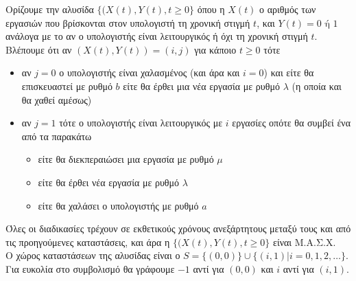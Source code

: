 \documentclass[a4paper,11pt]{article}
\newcommand{\mc}{Μ.Α.Σ.Χ. }
\begin{document}
Ορίζουμε την αλυσίδα $\{(X(t),Y(t),t\geq 0\}$ όπου η $X(t)$ ο αριθμός των εργασιών που βρίσκονται στον υπολογιστή τη χρονική στιγμή $t$, και $Y(t)=0 \text{ ή } 1$ ανάλογα με το αν ο υπολογιστής είναι λειτουργικός ή όχι τη χρονική στιγμή $t$.
\\[8pt]
Βλέπουμε ότι αν $(X(t),Y(t)) = (i,j)$ για κάποιο $t \geq 0$ τότε
\begin{itemize}
	\item αν $j=0$ ο υπολογιστής είναι χαλασμένος (και άρα και $i=0$) και είτε θα επισκευαστεί με ρυθμό $b$ είτε θα έρθει μια νέα εργασία με ρυθμό $\lambda$ (η οποία και θα χαθεί αμέσως)
	\item αν $j=1$ τότε ο υπολογιστής είναι λειτουργικός με $i$ εργασίες οπότε θα συμβεί ένα από τα παρακάτω
		\begin{itemize}
			\item είτε θα διεκπεραιώσει μια εργασία με ρυθμό $\mu$
			\item είτε θα έρθει νέα εργασία με ρυθμό $\lambda$
			\item είτε θα χαλάσει ο υπολογιστής με ρυθμό $a$
		\end{itemize}
\end{itemize}
Όλες οι διαδικασίες τρέχουν σε εκθετικούς χρόνους ανεξάρτητους μεταξύ τους και από τις προηγούμενες καταστάσεις, και άρα η $\{(X(t),Y(t),t\geq 0\}$ είναι \mc
\pagebreak\\
Ο χώρος καταστάσεων της αλυσίδας είναι ο $S = \{(0,0)\} \cup \{(i,1)|i=0,1,2,\dots\}$.
Για ευκολία στο συμβολισμό θα γράφουμε $-1$ αντί για $(0,0)$ και $i$ αντί για $(i,1)$.
\begin{center}
\end{center}
\end{document}
